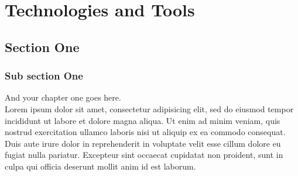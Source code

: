 \chapter{Technologies and Tools}%
\label{chap:chap5}

\section{Section One}
\label{section:chap5:sec1}

  \subsection{Sub section One}
  And your chapter one goes here\cite{web001}\@. ~\\
  Lorem ipsum dolor sit amet, consectetur adipisicing elit, sed do eiusmod
  tempor incididunt ut labore et dolore magna aliqua. Ut enim ad minim veniam,
  quis nostrud exercitation ullamco laboris nisi ut aliquip ex ea commodo
  consequat. Duis aute irure dolor in reprehenderit in voluptate velit esse
  cillum dolore eu fugiat nulla pariatur. Excepteur sint occaecat cupidatat non
  proident, sunt in culpa qui officia deserunt mollit anim id est laborum.


